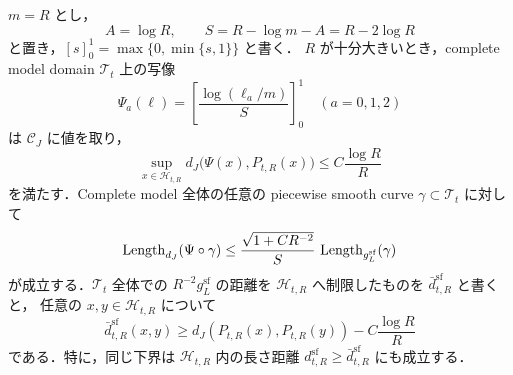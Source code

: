 \begin{lemma}
\label{simplex:lem:closed-corner-no-shortcut}
$m=R$ とし，
\[
 A=\log R,\qquad S=R-\log m-A=R-2\log R
\]
と置き，$[s]_0^1=\max\{0,\min\{s,1\}\}$ と書く．
$R$ が十分大きいとき，complete model domain $\mathscr T_t$ 上の写像
\begin{equation}\label{simplex:eq:closed-corner-pruning}
 \Psi_a(\ell)
  =\left[\frac{\log(\ell_a/m)}S\right]_0^1
  \quad(a=0,1,2)
\end{equation}
は $\mathcal C_J$ に値を取り，
\begin{equation}\label{simplex:eq:pruning-close-softmax}
 \sup_{x\in\mathscr H_{t,R}}
 d_J\bigl(\Psi(x),P_{t,R}(x)\bigr)
 \le C\frac{\log R}R
\end{equation}
を満たす．Complete model 全体の任意の piecewise smooth curve
$\gamma\subset\mathscr T_t$ に対して
\begin{equation}\label{simplex:eq:pruning-all-paths}
 \operatorname{Length}_{d_J}(\Psi\circ\gamma)
 \le \frac{\sqrt{1+CR^{-2}}}{S}\,
                \operatorname{Length}_{g_L^{\mathrm{sf}}}(\gamma)
\end{equation}
が成立する．$\mathscr T_t$ 全体での $R^{-2}g_L^{\mathrm{sf}}$ の距離を
$\mathscr H_{t,R}$ へ制限したものを $\bar d_{t,R}^{\mathrm{sf}}$ と書くと，
任意の $x,y\in\mathscr H_{t,R}$ について
\begin{equation}\label{simplex:eq:closed-corner-distance-lower}
 \bar d_{t,R}^{\mathrm{sf}}(x,y)
 \ge d_J(P_{t,R}(x),P_{t,R}(y))-C\frac{\log R}R
\end{equation}
である．特に，同じ下界は $\mathscr H_{t,R}$ 内の長さ距離
$d_{t,R}^{\mathrm{sf}}\ge\bar d_{t,R}^{\mathrm{sf}}$ にも成立する．
\end{lemma}

